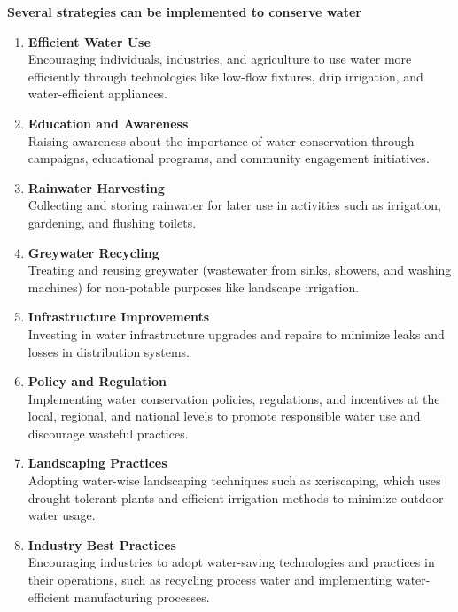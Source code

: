 \documentclass[12pt]{article}
\begin{document}
	\noindent \textbf{Several strategies can be implemented to conserve water}
	\begin{enumerate}[label=\textbf{\arabic*.}]
		\item \textbf{Efficient Water Use} \\
		Encouraging individuals, industries, and agriculture to use water more efficiently through technologies like low-flow fixtures, drip irrigation, and water-efficient appliances.

		\item \textbf{Education and Awareness} \\
		Raising awareness about the importance of water conservation through campaigns, educational programs, and community engagement initiatives.

		\item \textbf{Rainwater Harvesting} \\
		Collecting and storing rainwater for later use in activities such as irrigation, gardening, and flushing toilets.

		\item \textbf{Greywater Recycling} \\
		Treating and reusing greywater (wastewater from sinks, showers, and washing machines) for non-potable purposes like landscape irrigation.

		\item \textbf{Infrastructure Improvements} \\
		Investing in water infrastructure upgrades and repairs to minimize leaks and losses in distribution systems.
		 \newpage
		\item \textbf{Policy and Regulation} \\
		Implementing water conservation policies, regulations, and incentives at the local, regional, and national levels to promote responsible water use and discourage wasteful practices.

		\item \textbf{Landscaping Practices} \\
		Adopting water-wise landscaping techniques such as xeriscaping, which uses drought-tolerant plants and efficient irrigation methods to minimize outdoor water usage.

		\item \textbf{Industry Best Practices} \\
		Encouraging industries to adopt water-saving technologies and practices in their operations, such as recycling process water and implementing water-efficient manufacturing processes.
	\end{enumerate}
\end{document}
